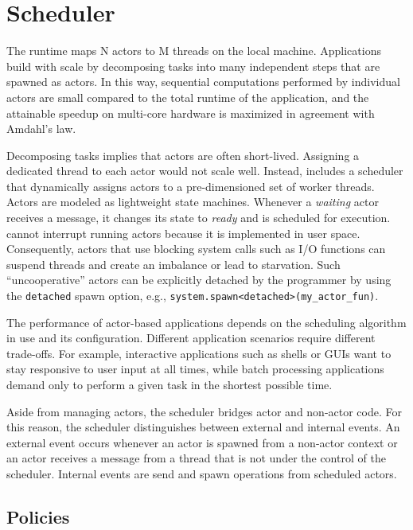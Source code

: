 \section{Scheduler}
\label{scheduler}

The \lib runtime maps N actors to M threads on the local machine. Applications
build with \lib scale by decomposing tasks into many independent steps that are
spawned as actors. In this way, sequential computations performed by individual
actors are small compared to the total runtime of the application, and the
attainable speedup on multi-core hardware is maximized in agreement with
Amdahl's law.

Decomposing tasks implies that actors are often short-lived. Assigning a
dedicated thread to each actor would not scale well. Instead, \lib includes a
scheduler that dynamically assigns actors to a pre-dimensioned set of worker
threads. Actors are modeled as lightweight state machines. Whenever a
\emph{waiting} actor receives a message, it changes its state to \emph{ready}
and is scheduled for execution. \lib cannot interrupt running actors because it
is implemented in user space. Consequently, actors that use blocking system
calls such as I/O functions can suspend threads and create an imbalance or lead
to starvation. Such ``uncooperative'' actors can be explicitly detached by the
programmer by using the \lstinline^detached^ spawn option, e.g.,
\lstinline^system.spawn<detached>(my_actor_fun)^.

The performance of actor-based applications depends on the scheduling algorithm
in use and its configuration. Different application scenarios require different
trade-offs. For example, interactive applications such as shells or GUIs want
to stay responsive to user input at all times, while batch processing
applications demand only to perform a given task in the shortest possible time.

Aside from managing actors, the scheduler bridges actor and non-actor code. For
this reason, the scheduler distinguishes between external and internal events.
An external event occurs whenever an actor is spawned from a non-actor context
or an actor receives a message from a thread that is not under the control of
the scheduler. Internal events are send and spawn operations from scheduled
actors.

\subsection{Policies}
\label{scheduler-policy}


